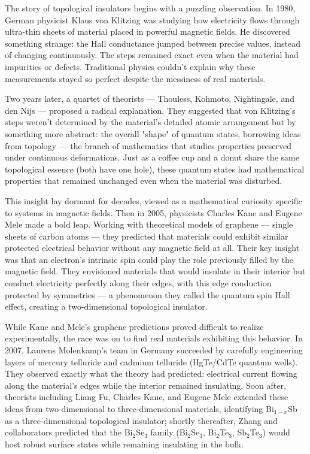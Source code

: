 \begin{historical}
The story of topological insulators begins with a puzzling observation. In 1980, German physicist Klaus von Klitzing was studying how electricity flows through ultra-thin sheets of material placed in powerful magnetic fields. He discovered something strange: the Hall conductance jumped between precise values, instead of changing continuously. The steps remained exact even when the material had impurities or defects. Traditional physics couldn't explain why these measurements stayed so perfect despite the messiness of real materials.

Two years later, a quartet of theorists — Thouless, Kohmoto, Nightingale, and den Nijs — proposed a radical explanation. They suggested that von Klitzing's steps weren't determined by the material's detailed atomic arrangement but by something more abstract: the overall "shape" of quantum states, borrowing ideas from topology — the branch of mathematics that studies properties preserved under continuous deformations. Just as a coffee cup and a donut share the same topological essence (both have one hole), these quantum states had mathematical properties that remained unchanged even when the material was disturbed.

This insight lay dormant for decades, viewed as a mathematical curiosity specific to systems in magnetic fields. Then in 2005, physicists Charles Kane and Eugene Mele made a bold leap. Working with theoretical models of graphene — single sheets of carbon atoms — they predicted that materials could exhibit similar protected electrical behavior without any magnetic field at all. Their key insight was that an electron's intrinsic spin could play the role previously filled by the magnetic field. They envisioned materials that would insulate in their interior but conduct electricity perfectly along their edges, with this edge conduction protected by symmetries — a phenomenon they called the quantum spin Hall effect, creating a two-dimensional topological insulator.

While Kane and Mele's graphene predictions proved difficult to realize experimentally, the race was on to find real materials exhibiting this behavior. In 2007, Laurens Molenkamp's team in Germany succeeded by carefully engineering layers of mercury telluride and cadmium telluride (HgTe/CdTe quantum wells). They observed exactly what the theory had predicted: electrical current flowing along the material's edges while the interior remained insulating. Soon after, theorists including Liang Fu, Charles Kane, and Eugene Mele extended these ideas from two-dimensional to three-dimensional materials, identifying Bi$_{1-x}$Sb as a three-dimensional topological insulator; shortly thereafter, Zhang and collaborators predicted that the Bi$_2$Se$_3$ family (Bi$_2$Se$_3$, Bi$_2$Te$_3$, Sb$_2$Te$_3$) would host robust surface states while remaining insulating in the bulk.


\end{historical}
